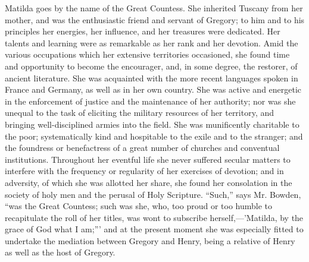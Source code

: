 Matilda goes by the name of the Great Countess.
She inherited Tuscany from her mother, and was the enthusiastic friend
and servant of Gregory; to him and to his principles her energies, her
influence, and her treasures were dedicated. Her talents and learning
were as remarkable as her rank and her devotion. Amid the various
occupations which her extensive territories occasioned, she found time
and opportunity to become the encourager, and, in some degree, the
restorer, of ancient literature. She was acquainted with the more
recent languages spoken in France and Germany, as well as in her own
country. She was active and energetic in the enforcement of justice
and the maintenance of her authority; nor was she unequal to the task
of eliciting the military resources of her territory, and bringing
well-disciplined armies into the field. She was munificently
charitable to the poor; systematically kind and hospitable to the
exile and to the stranger; and the foundress or benefactress of
a great number of churches and conventual institutions. Throughout her
eventful life she never suffered secular matters to interfere with the
frequency or regularity of her exercises of devotion; and in
adversity, of which she was allotted her share, she found her
consolation in the society of holy men and the perusal of Holy
Scripture. ``Such,'' says Mr. Bowden, ``was the Great Countess; such was
she, who, too proud or too humble to recapitulate the roll of her
titles, was wont to subscribe herself,—'Matilda, by the grace of God
what I am;''' and at the present moment she was especially fitted to
undertake the mediation between Gregory and Henry, being a relative of
Henry as well as the host of Gregory.

